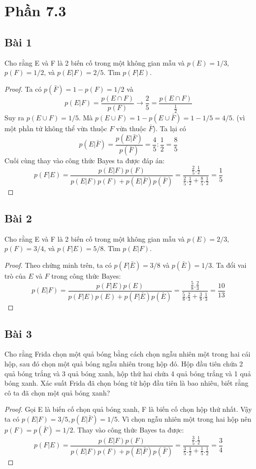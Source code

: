 \section*{Phần 7.3}
\subsection*{Bài 1}
Cho rằng E và F là 2 biến cố trong một không gian mẫu và $p(E)=1/3$, $p(F)=1/2$, và $p(E|F)=2/5$. Tìm $p(F|E)$.
\begin{proof}
    Ta có $p(\bar F)=1-p(F)=1/2$ và $$p(E|F)=\frac{p(E\cap F)}{p(F)}\rightarrow\frac{2}{5}=\frac{p(E\cap F)}{\frac{1}{2}}$$
    Suy ra $p(E\cup F)=1/5.$ Mà $p(E\cup F)=1-p(E\cup\bar F)=1-1/5=4/5.$ (vì một phần tử không thể vừa thuộc $F$ vừa thuộc $\bar F$). Ta lại có $$p(E|\bar F)=\frac{p(E|\bar F)}{p(\bar F)}=\frac{4}{5}:\frac{1}{2}=\frac{8}{5}$$
    Cuối cùng thay vào công thức Bayes ta được đáp án:
    $$p(F|E)=\frac{p(E|F)p(F)}{p(E|F)p(F)+p(E|\bar F)p(\bar F)}=\frac{\frac{2}{5}.\frac{1}{2}}{\frac{2}{5}.\frac{1}{2}+\frac{8}{5}.\frac{1}{2}}=\frac{1}{5}$$
\end{proof}
\subsection*{Bài 2}
Cho rằng E và F là 2 biến cố trong một không gian mẫu và $p(E)=2/3$, $p(F)=3/4$, và $p(F|E)=5/8$. Tìm $p(E|F)$.
\begin{proof}
    Theo chứng minh trên, ta có $p(F|\bar E)=3/8$ và $p(\bar E)=1/3$. Ta đổi vai trò của $E$ và $F$ trong công thức Bayes:
    $$p(E|F)=\frac{p(F|E)p(E)}{p(F|E)p(E)+p(F|\bar E)p(\bar E)}=\frac{\frac{5}{8}.\frac{2}{3}}{\frac{5}{8}.\frac{2}{3}+\frac{3}{8}.\frac{1}{3}}=\frac{10}{13}$$
\end{proof}
\subsection*{Bài 3}
Cho rằng Frida chọn một quả bóng bằng cách chọn ngẫu nhiên một trong hai cái hộp, sau đó chọn một quả bóng ngẫu nhiên trong hộp đó. Hộp đầu tiên chứa 2 quả bóng trắng và 3 quả bóng xanh, hộp thứ hai chứa 4 quả bóng trắng và 1 quả bóng xanh. Xác suất Frida đã chọn bóng từ hộp đầu tiên là bao nhiêu, biết rằng cô ta đã chọn một quả bóng xanh?
\begin{proof}
    Gọi E là biến cố chọn quả bóng xanh, F là biến cố chọn hộp thứ nhất. Vậy ta có $p(E|F)=3/5,p(E|\bar F)=1/5$. Vì chọn ngẫu nhiên một trong hai hộp nên $p(F)=p(\bar F)=1/2$. Thay vào công thức Bayes ta được:
    $$p(F|E)=\frac{p(E|F)p(F)}{p(E|F)p(F)+p(E|\bar F)p(\bar F)}=\frac{\frac{3}{5}.\frac{1}{2}}{\frac{3}{5}.\frac{1}{2}+\frac{1}{5}.\frac{1}{2}}=\frac{3}{4}$$
\end{proof}
